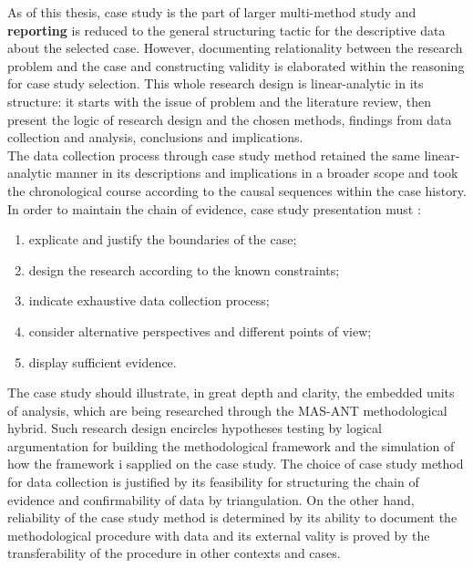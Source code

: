 \documentclass[11pt]{report}
\begin{document}
As of this thesis, case study is the part of larger multi-method study and \textbf{reporting} is reduced to the general structuring tactic for the descriptive data about the selected case.
However, documenting relationality between the research problem and the case and constructing validity is elaborated within the reasoning for case study selection.
This whole research design is linear-analytic in its structure: it starts with the issue of problem and the literature review, then present the logic of research design and the chosen methods, findings from data collection and analysis, conclusions and implications.
\\

The data collection process through case study method retained the same linear-analytic manner in its descriptions and implications in a broader scope and took the chronological course according to the causal sequences within the case history. In order to maintain the chain of evidence, case study presentation must \cite{(Yin XXX)}:
\begin{enumerate}
\item explicate and justify the boundaries of the case;
\item design the research according to the known constraints;
\item indicate exhaustive data collection process;
\item consider alternative perspectives and different points of view;
\item display sufficient evidence.
\end{enumerate}

The case study should illustrate, in great depth and clarity, the embedded units of analysis, which are being researched through the MAS-ANT methodological hybrid. Such research design encircles hypotheses testing by logical argumentation for building the methodological framework and the simulation of how the framework i sapplied on the case study. The choice of case study method for data collection is justified by its feasibility for structuring the chain of evidence and confirmability of data by triangulation. On the other hand, reliability of the case study method is determined by its ability to document the methodological procedure with data and its external vality is proved by the transferability of the procedure in other contexts and cases.
\\
\end{document}
